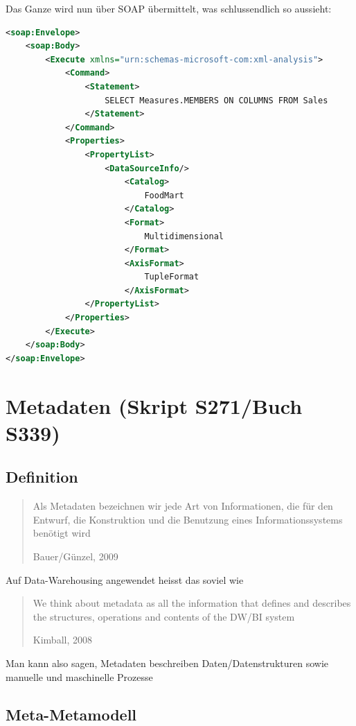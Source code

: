\documentclass[a4paper, 11pt, nofootinbib]{article}
\begin{document}
\noindent Das Ganze wird nun über SOAP übermittelt, was schlussendlich so aussieht:

\begin{lstlisting}[language=xml, captionpos=b, caption={SELECT-Anfrage in XMLA verpackt, über SOAP versendet}]
<soap:Envelope>
	<soap:Body>
		<Execute xmlns="urn:schemas-microsoft-com:xml-analysis">
			<Command>
				<Statement>
					SELECT Measures.MEMBERS ON COLUMNS FROM Sales
				</Statement>
			</Command>
			<Properties>
				<PropertyList>
					<DataSourceInfo/>
						<Catalog>
							FoodMart
						</Catalog>
						<Format>
							Multidimensional
						</Format>
						<AxisFormat>
							TupleFormat
						</AxisFormat>
				</PropertyList>
			</Properties>
		</Execute>
	</soap:Body>
</soap:Envelope>
\end{lstlisting}
\restoregeometry

\section{Metadaten (Skript S271/Buch S339)}

\subsection{Definition}
\begin{center}
	\blockquote[Bauer/Günzel, 2009]{Als Metadaten bezeichnen wir jede Art von Informationen, die für den Entwurf, die Konstruktion und die Benutzung eines Informationssystems benötigt wird \\}
\end{center}

\noindent Auf Data-Warehousing angewendet heisst das soviel wie

\begin{center}
	\blockquote[Kimball, 2008]{We think about metadata as all the information that defines and describes the structures, operations and contents of the DW/BI system}
\end{center}

\noindent Man kann also sagen, Metadaten beschreiben Daten/Datenstrukturen sowie manuelle und maschinelle Prozesse

\subsection{Meta-Metamodell}
\end{document}
